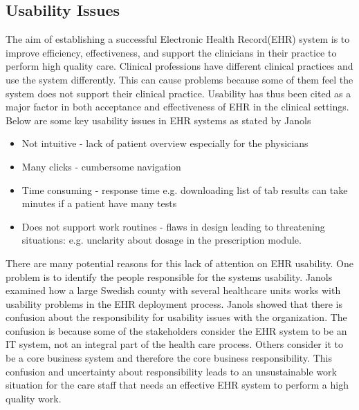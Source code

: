 \documentclass[14pt]{article}
\begin{document}
\subsection{Usability Issues}
\label{sec:futureUsability}
The aim of establishing a successful Electronic Health Record(\gls{EHR}) system is to improve efficiency, effectiveness, and support the clinicians in their practice to perform high quality care. Clinical professions have different clinical practices and use the system differently. This can cause problems because some of them feel the system does not support their clinical practice. Usability has thus been cited as a major factor in both acceptance and effectiveness of \gls{EHR} in the clinical settings. Below are some key usability issues in \gls{EHR} systems as stated by Janols\cite{Janols}  
\begin{itemize}
\item Not intuitive - lack of patient overview especially for the physicians
\item Many clicks - cumbersome navigation
\item Time consuming - response time e.g. downloading list of tab results can take minutes if a patient have many tests
\item Does not support work routines - flaws in design leading to threatening situations:  e.g. unclarity about dosage in the  prescription module.
\end{itemize}

There are many potential reasons for this lack of attention on \gls{EHR} usability. One problem is to identify the people responsible for the systems usability. Janols \cite{Janols} examined how a large Swedish county with several healthcare units works with usability problems in the \gls{EHR} deployment process. Janols \cite{Janols} showed that there is confusion about the responsibility for usability issues with the organization. The confusion is because some of the stakeholders consider the \gls{EHR} system to be an IT system, not an integral part of the health care process. Others consider it to be a core business system and therefore the core business responsibility. This confusion and uncertainty about responsibility leads to an unsustainable work situation for the care staff that needs an effective \gls{EHR} system to perform a high quality work.
\end{document}
